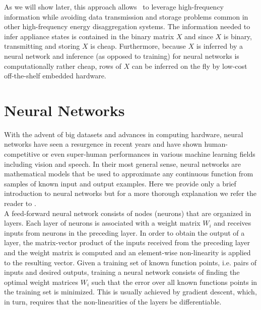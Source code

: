  As we will show later, this approach allows \ourname~to leverage high-frequency information while avoiding data transmission and storage problems common in other high-frequency energy disaggregation systems. The information needed to infer appliance states is contained in the binary matrix $X$ and since $X$ is binary, transmitting and storing $X$ is cheap. Furthermore, because $X$ is inferred by a neural network and inference (as opposed to training) for neural networks is computationally rather cheap, rows of $X$ can be inferred on the fly by low-cost off-the-shelf embedded hardware.
 
\section{Neural Networks}
With the advent of big datasets and advances in computing hardware, neural networks have seen a resurgence in recent years and have shown human-competitive or even super-human performances in various machine learning fields including vision and speech. In their most general sense, neural networks are mathematical models that be used to approximate any continuous function from samples of known input and output examples. Here we provide only a brief introduction to neural networks but for a more thorough explanation we refer the reader to \cite{schmidhuber2015deep}. \\
 A feed-forward neural network consists of nodes (neurons) that are organized in layers. Each layer of neurons is associated with a weight matrix $W_i$ and receives inputs from neurons in the preceding layer. In order to obtain the output of a layer, the matrix-vector product of the inputs received from the preceding layer and the weight matrix is computed and an element-wise non-linearity is applied to the resulting vector. Given a training set of known function points, i.e. pairs of inputs and desired outputs, training a neural network consists of finding the optimal weight matrices $W_i$ such that the error over all known functions points in the training set is minimized. This is usually achieved by gradient descent, which, in turn, requires that the non-linearities of the layers be differentiable.\\
